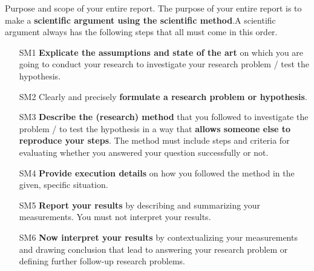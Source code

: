 \documentclass[
	a4paper,
	pagesize,
	pdftex,
	12pt,
	ngerman,
	fleqn,
	final,
	]{scrartcl}
\theoremstyle{plain}
\theoremstyle{definition}
\begin{document}

\mitverteidigung %
\makeTitel


\tableofcontents
\newpage

\textsf{Purpose and scope of your entire report.} The purpose of your entire report is to make a 
\textbf{scientific argument using the scientific method}.A scientific argument always has the following steps that all must come in this order.

\begin{itemize}
	\item[SM1] \textbf{Explicate the assumptions and state of the art} on which you are going to conduct your research to investigate your research problem / test the hypothesis.
	\item[SM2] Clearly and precisely \textbf{formulate a research problem or hypothesis}.
	\item[SM3] \textbf{Describe the (research) method} that you followed to investigate the problem / to test the hypothesis in a way that \textbf{allows someone else to reproduce your steps}. The method must include steps and criteria for evaluating whether you answered your question successfully or not.
	\item[SM4] \textbf{Provide execution details} on how you followed the method in the given, specific situation.
	\item[SM5] \textbf{Report your results} by describing and summarizing your measurements. You must not interpret your results.
	\item[SM6] \textbf{Now interpret your results} by contextualizing your measurements and drawing conclusion that lead to answering your research problem or defining further follow-up research problems.
	
\end{itemize}
\end{document}
